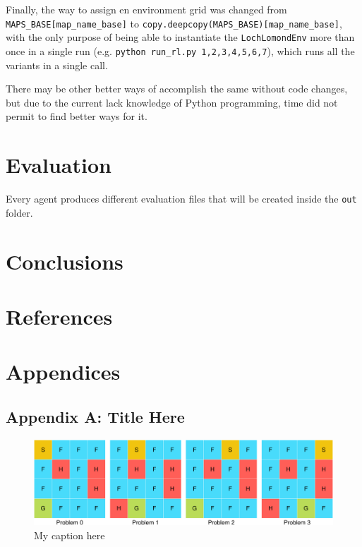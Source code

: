 \documentclass[11pt,]{article}
\begin{document}
Finally, the way to assign en environment grid was changed from
\texttt{MAPS\_BASE{[}map\_name\_base{]}} to
\texttt{copy.deepcopy(MAPS\_BASE){[}map\_name\_base{]}}, with the only
purpose of being able to instantiate the \texttt{LochLomondEnv} more
than once in a single run (e.g.
\texttt{python\ run\_rl.py\ 1,2,3,4,5,6,7}), which runs all the variants
in a single call.

There may be other better ways of accomplish the same without code
changes, but due to the current lack knowledge of Python programming,
time did not permit to find better ways for it.

\section{Evaluation}\label{evaluation}

Every agent produces different evaluation files that will be created
inside the \texttt{out} folder.

\section{Conclusions}\label{sec:con}

\newpage

\section{References}\label{references}

\newpage

\section{Appendices}\label{appendices}

\subsection{Appendix A: Title Here}\label{appendix-a-title-here}

\begin{figure}[h]

{\centering \includegraphics[width=0.9\linewidth]{project_files/figure-latex/unnamed-chunk-6-1} 

}

\caption{\label{fig:appendixa} My caption here}\label{fig:unnamed-chunk-6}
\end{figure}
\end{document}
